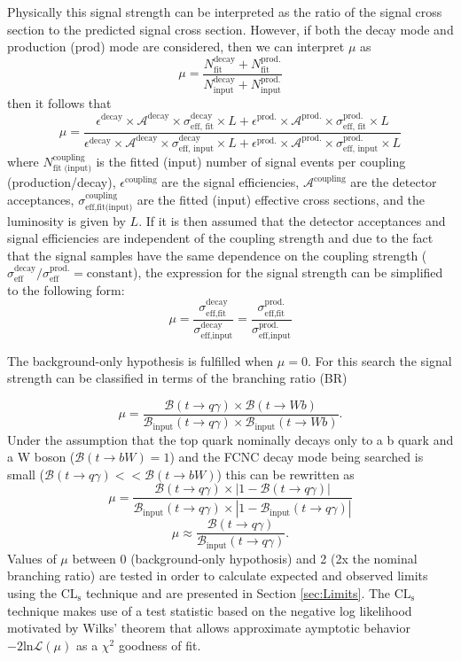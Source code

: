 Physically this signal strength can be interpreted as the ratio of the signal cross section to the predicted signal cross section.  However, if both the decay mode and production (prod) mode are considered, then we can interpret $\mu$ as 
\[\mu = \frac{N_\text{fit}^\text{decay} + N_\text{fit}^\text{prod.}}{N_\text{input}^\text{decay} + N_\text{input}^\text{prod.}}
\]then it follows that 
\[\mu = \frac{\epsilon^\text{decay}\times \mathcal{A}^\text{decay} \times \sigma^\text{decay}_\text{eff, fit}\times L+\epsilon^\text{prod.}\times \mathcal{A}^\text{prod.} \times \sigma^\text{prod.}_\text{eff, fit} \times L}{\epsilon^\text{decay}\times \mathcal{A}^\text{decay} \times \sigma^\text{decay}_\text{eff, input} \times L+\epsilon^\text{prod.}\times \mathcal{A}^\text{prod.} \times \sigma^\text{prod.}_\text{eff, input}\times L}
\]
where $N_\text{fit (input)}^\text{coupling}$ is the fitted (input) number of signal events per coupling (production/decay), $\epsilon^\text{coupling}$ are the signal efficiencies, $\mathcal{A}^\text{coupling}$ are the detector acceptances, $\sigma_\text{eff,fit(input)}^\text{coupling}$ are the fitted (input) effective cross sections, and the luminosity is given by $L$.  If it is then assumed that the detector acceptances and signal efficiencies are independent of the coupling strength and due to the fact that the signal samples have the same dependence on the coupling strength ($\sigma_\text{eff}^\text{decay}/ \sigma_\text{eff}^\text{prod.} = \text{constant}$), the expression for the signal strength can be simplified to the following form:
\[ \mu = \frac{\sigma_\text{eff,fit}^\text{decay}}{\sigma_\text{eff,input}^\text{decay}}=\frac{\sigma_\text{eff,fit}^\text{prod.}}{\sigma_\text{eff,input}^\text{prod.}}
\]

The background-only hypothesis is fulfilled when $\mu=0$.
For this search the signal strength can be classified in terms of the branching ratio (BR)

\[ \mu = \frac{\mathcal{B}(t\rightarrow q\gamma) \times \mathcal{B}(t\rightarrow Wb)}{\mathcal{B}_\text{input}(t\rightarrow q\gamma) \times \mathcal{B}_\text{input}(t\rightarrow Wb)}.
\]
Under the assumption that the top quark nominally decays only to a b quark and a W boson ($\mathcal{B}(t\rightarrow bW)=1$) and the FCNC decay mode being searched is small ($\mathcal{B}(t\rightarrow q\gamma) << \mathcal{B}(t\rightarrow bW)$) this can be rewritten as 
\[ \mu = \frac{\mathcal{B}(t\rightarrow q\gamma) \times|1-\mathcal{B}(t\rightarrow q\gamma)|}{\mathcal{B}_\text{input}(t\rightarrow q\gamma) \times|1-\mathcal{B}_\text{input}(t\rightarrow q\gamma)|}
\]
\[ \mu \approx \frac{\mathcal{B}(t\rightarrow q\gamma)}{\mathcal{B}_\text{input}(t\rightarrow q\gamma)}.
\]
Values of $\mu$ between 0 (background-only hypothosis) and 2 (2x the nominal branching ratio) are tested in order to calculate expected and observed limits using the $\text{CL}_\text{s}$ technique\cite{Read:2002hq} and are presented in Section \ref{sec:Limits}.  The $\text{CL}_\text{s}$ technique makes use of a test statistic based on the negative log likelihood motivated by  Wilks' theorem that allows approximate aymptotic behavior $-2 \text{ln} \mathcal{L}(\mu)$ as a $\chi^2$ goodness of fit\cite{Wilks:1938dza}. %




